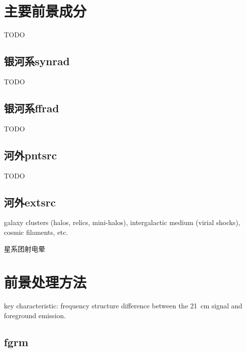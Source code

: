 \section{主要前景成分}

TODO

\subsection{银河系\acl{synrad}}  %

TODO

\subsection{银河系\acl{ffrad}}  %

TODO

\subsection{河外\acl{pntsrc}}  %

TODO

\subsection{河外\acl{extsrc}}  %

galaxy clusters (halos, relics, mini-halos),
intergalactic medium (virial shocks),
cosmic filaments, etc.

星系团射电晕


\section{前景处理方法}

key characteristic: frequency structure difference between
the 21~cm signal and foreground emission.

\subsection{\acl{fgrm}}  %

